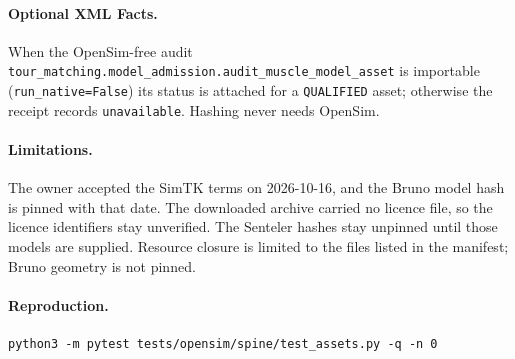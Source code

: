 \paragraph{Optional XML Facts.}
When the OpenSim-free audit
\texttt{tour\_matching.model\_admission.audit\_muscle\_model\_asset} is importable
(\texttt{run\_native=False}) its status is attached for a \texttt{QUALIFIED}
asset; otherwise the receipt records \texttt{unavailable}. Hashing never needs
OpenSim.

\paragraph{Limitations.}
The owner accepted the SimTK terms on 2026-10-16, and the Bruno model hash is
pinned with that date. The downloaded archive carried no licence file, so the
licence identifiers stay unverified. The Senteler hashes stay unpinned until
those models are supplied. Resource closure is limited to the files listed in
the manifest; Bruno geometry is not pinned.

\paragraph{Reproduction.}
\begin{verbatim}
python3 -m pytest tests/opensim/spine/test_assets.py -q -n 0
\end{verbatim}
